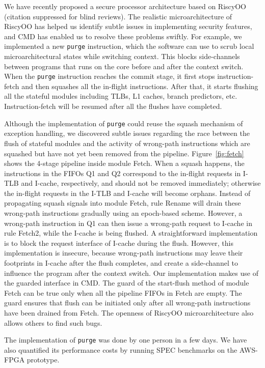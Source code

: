 \documentclass[conference]{IEEEtran}
\newcommand{\flushInst}{\texttt{purge}\xspace}
\begin{document}
We have recently proposed a secure processor architecture based on RiscyOO (citation suppressed for blind reviews).
The realistic microarchitecture of RiscyOO has helped us identify subtle issues in implementing security features, and CMD has enabled us to resolve these problems swiftly.
For example, we implemented a new \flushInst{} instruction, which the software can use to scrub local microarchitectural states while switching context. This blocks side-channels between programs that runs on the core before and after the context switch.
When the \flushInst{} instruction reaches the commit stage, it first stops instruction-fetch and then squashes all the in-flight instructions.
After that, it starts flushing all the stateful modules including TLBs, L1 caches, branch predictors, etc.
Instruction-fetch will be resumed after all the flushes have completed.

Although the implementation of \flushInst{} could reuse the squash mechanism of exception handling, we discovered subtle issues regarding the race between the flush of stateful modules and the activity of wrong-path instructions which are squashed but have not yet been removed from the pipeline.
Figure~\ref{fig:fetch} shows the 4-stage pipeline inside module Fetch.
When a squash happens, the instructions in the FIFOs Q1 and Q2 correspond to the in-flight requests in I-TLB and I-cache, respectively, and should not be removed immediately; otherwise the in-flight requests in the I-TLB and I-cache will become orphans.
Instead of propagating squash signals into module Fetch, rule Rename will drain these wrong-path instructions gradually using an epoch-based scheme.
However, a wrong-path instruction in Q1 can then issue a wrong-path request to I-cache in rule Fetch2, while the I-cache is being flushed.
A straightforward implementation is to block the request interface of I-cache during the flush.
However, this implementation is insecure, because wrong-path instructions may leave their footprints in I-cache after the flush completes, and create a side-channel to influence the program after the context switch.
Our implementation makes use of the guarded interface in CMD.
The guard of the start-flush method of module Fetch can be true only when all the pipeline FIFOs in Fetch are empty.
The guard ensures that flush can be initiated only after all wrong-path instructions have been drained from Fetch.
The openness of RiscyOO microarchitecture also allows others to find such bugs.

The implementation of \flushInst{} was done by one person in a few days.
We have also quantified its performance costs by running SPEC benchmarks on the AWS-FPGA prototype.
\end{document}
